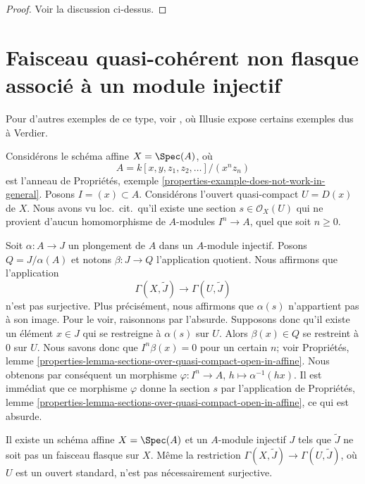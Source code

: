 \begin{proof}
Voir la discussion ci-dessus.
\end{proof}




\section[Faisceau quasi-cohérent non flasque d'un module injectif]{Faisceau quasi-cohérent non flasque associé à un module injectif}
\label{section-nonflasque}

\noindent
Pour d'autres exemples de ce type, voir \cite[Expos\'e II, Appendix I]{SGA6},
où Illusie expose certains exemples dus à Verdier.

\medskip\noindent
Considérons le schéma affine $X = \Spec(A)$, où
$$
A = k[x, y, z_1, z_2, \ldots]/(x^nz_n)
$$
est l'anneau de
Propriétés, exemple \ref{properties-example-does-not-work-in-general}.
Posons $I = (x) \subset A$. Considérons l'ouvert quasi-compact $U = D(x)$ de $X$.
Nous avons vu loc.\ cit.\ qu'il existe une section
$s \in \mathcal{O}_X(U)$ qui ne provient d'aucun homomorphisme de $A$-modules
$I^n \to A$, quel que soit $n \geq 0$.

\medskip\noindent
Soit $\alpha : A \to J$ un plongement de $A$ dans un $A$-module injectif.
Posons $Q = J/\alpha(A)$ et notons $\beta : J \to Q$ l'application quotient.
Nous affirmons que l'application
$$
\Gamma(X, \widetilde{J})
\longrightarrow
\Gamma(U, \widetilde{J})
$$
n'est pas surjective. Plus précisément, nous affirmons que $\alpha(s)$
n'appartient pas à son image. Pour le voir, raisonnons par l'absurde.
Supposons donc qu'il existe un élément $x \in J$ qui se restreigne à
$\alpha(s)$ sur $U$. Alors $\beta(x) \in Q$ se restreint à $0$ sur $U$. Nous savons donc que
$I^n\beta(x) = 0$ pour un certain $n$; voir
Propriétés,
lemme \ref{properties-lemma-sections-over-quasi-compact-open-in-affine}.
Nous obtenons par conséquent un morphisme
$\varphi : I^n \to A$, $h \mapsto \alpha^{-1}(hx)$. Il est immédiat que
ce morphisme $\varphi$ donne la section $s$ par l'application de
Propriétés,
lemme \ref{properties-lemma-sections-over-quasi-compact-open-in-affine},
ce qui est absurde.

\begin{lemma}
\label{lemma-nonflasque}
Il existe un schéma affine $X = \Spec(A)$ et un $A$-module injectif $J$
tels que $\widetilde{J}$ ne soit pas un faisceau flasque sur $X$.
Même la restriction $\Gamma(X, \widetilde{J}) \to \Gamma(U, \widetilde{J})$,
où $U$ est un ouvert standard, n'est pas nécessairement surjective.
\end{lemma}

